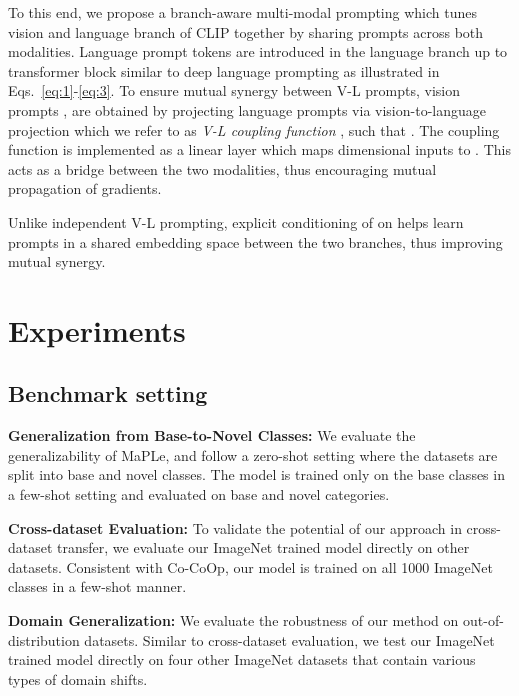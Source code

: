 \documentclass[10pt,twocolumn,letterpaper]{article}
\begin{document}
To this end, we propose a branch-aware multi-modal prompting which tunes vision and language branch of CLIP together by sharing prompts across both modalities. Language prompt tokens are introduced in the language branch up to  transformer block similar to deep language prompting as illustrated in Eqs.~\ref{eq:1}-\ref{eq:3}. To ensure mutual synergy between V-L prompts, vision prompts , are obtained by projecting language prompts  via vision-to-language projection which we refer to as \textit{V-L coupling function} , such that . The coupling function is implemented as a linear layer which maps  dimensional inputs to . This acts as a bridge between the two modalities, thus encouraging mutual propagation of gradients.

Unlike independent V-L prompting, explicit conditioning of  on  helps learn prompts in a shared embedding space between the two branches, thus improving mutual synergy. 

\section{Experiments}
\subsection{Benchmark setting}


\noindent \textbf{Generalization from Base-to-Novel Classes:} We evaluate the generalizability of MaPLe, and follow a zero-shot setting where the datasets are split into base and novel classes. The model is trained only on the base classes in a few-shot setting and evaluated on base and novel categories.

\noindent  \textbf{Cross-dataset Evaluation:} To validate the potential of our approach in cross-dataset transfer, we evaluate  our ImageNet trained model directly on other datasets. Consistent with Co-CoOp, our model is trained on all 1000 ImageNet classes in a few-shot manner.

\noindent  \textbf{Domain Generalization:} We evaluate the robustness of our method on out-of-distribution datasets. Similar to cross-dataset evaluation, we test our ImageNet trained model directly on four other ImageNet datasets that contain various types of domain shifts.
\end{document}
